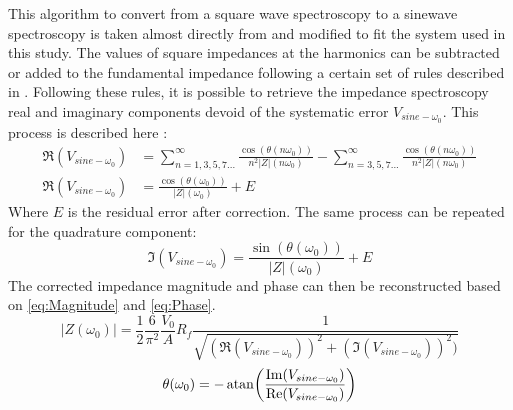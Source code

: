 This algorithm to convert from a square wave spectroscopy to a sinewave spectroscopy is taken almost directly from \citep{Subhan2019} and modified to fit the system used in this study. The values of square impedances at the harmonics can be subtracted or added to the fundamental impedance following a certain set of rules described in \citep{Subhan2019}. Following these rules, it is possible to retrieve the impedance spectroscopy real and imaginary components devoid of the systematic error $V_{sine-\omega_0}$. This process is described here :  
\begin{align}
\label{eq:correctionReal}
   \Re(V_{sine-\omega_0}) &= \displaystyle\sum_{n=1,3,5,7...} ^{\infty} \frac{\cos(\theta(n \omega_0))}{n^2\lvert Z \rvert (n \omega_0)} - \displaystyle\sum_{n=3,5,7...} ^{\infty} \frac{\cos(\theta(n \omega_0))}{n^2\lvert Z \rvert (n \omega_0)}\nonumber\\
   \Re(V_{sine-\omega_0}) &= \frac{\cos(\theta(\omega_0))}{\lvert Z \rvert (\omega_0)} + E
\end{align}
Where $E$ is the residual error after correction. The same process can be repeated for the quadrature component:
\begin{equation}
   \Im(V_{sine-\omega_0}) = \frac{\sin(\theta(\omega_0))}{\lvert Z \rvert (\omega_0)} + E
\end{equation}
The corrected impedance magnitude and phase can then be reconstructed based on \autoref{eq:Magnitude} and \autoref{eq:Phase}.
\begin{equation}
    \label{eq:CorrectedMagnitude}
   \lvert Z(\omega_0) \rvert = \frac{1}{2} \frac{6}{\pi^2} \frac{V_0}{A} R_f \frac{1}{\sqrt{(\Re(V_{sine-\omega_0}))^2+(\Im(V_{sine-\omega_0}))^2)}}
\end{equation}
\begin{equation}
\label{eq:CorrectedPhase}
   \theta(\omega_0) = -\atan(\frac{\Im(V_{sine-\omega_0})}{\Re(V_{sine-\omega_0})})
\end{equation}